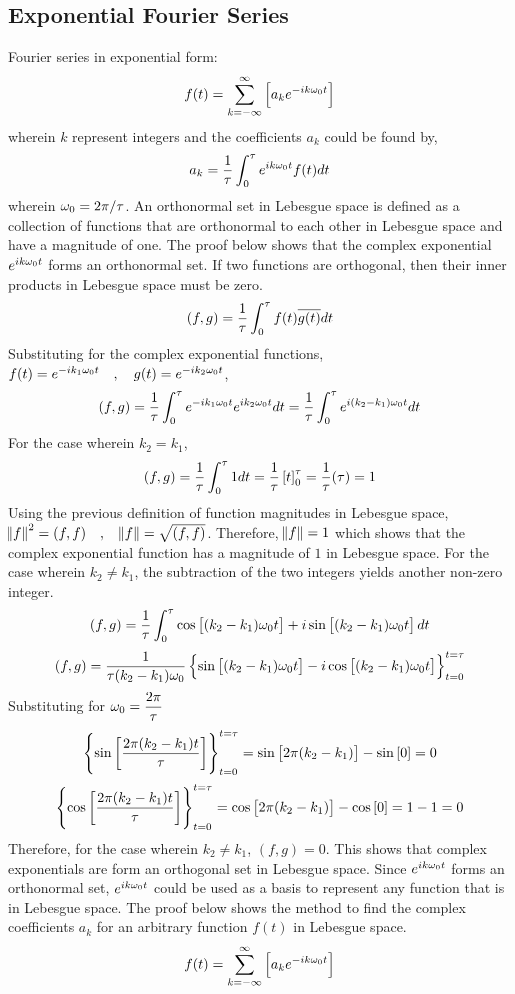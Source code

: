 \documentclass[class=report, 12pt, crop=false]{standalone}
\begin{document}
\begin{center}
\section{Exponential Fourier Series}
\begin{comment}
\end{comment}
Fourier series in exponential form:
$$f(t) = \sum^{\infty}_{k = -\infty}\left[a_ke^{-ik\omega_0t}\right]$$
wherein $k$ represent integers and the coefficients $a_k$ could be found by,
$$a_k = \frac{1}{\tau}\int^{\tau}_{0}e^{ik\omega_0t}f(t)dt$$
wherein $\omega_0 = 2\pi/\tau$. An orthonormal set in Lebesgue space is defined as a collection of functions that are orthonormal to each other in Lebesgue space and have a magnitude of one. The proof below shows that the complex exponential $e^{ik\omega_0t}$ forms an orthonormal set. If two functions are orthogonal, then their inner products in Lebesgue space must be zero.
$$(f,g) = \frac{1}{\tau}\int^{\tau}_{0}f(t)\overline{g(t)}dt$$
Substituting for the complex exponential functions, $f(t) = e^{-ik_1\omega_0t}\quad,\quad g(t) = e^{-ik_2\omega_0t}$,
$$(f,g) = \frac{1}{\tau}\int^{\tau}_{0}e^{-ik_1\omega_0t} e^{ik_2\omega_0t}dt = \frac{1}{\tau}\int^{\tau}_{0}e^{i(k_2-k_1)\omega_0t}dt$$
For the case wherein $k_2 = k_1$, 
$$(f,g) = \frac{1}{\tau}\int^{\tau}_{0}1dt = \frac{1}{\tau} \left[t\right]^{\tau}_{0} = \frac{1}{\tau}(\tau) = 1$$
Using the previous definition of function magnitudes in Lebesgue space, $\norm{f}^2 = (f,f)\quad,\quad\norm{f} = \sqrt{(f,f)}$. Therefore, $\norm{f} = 1$ which shows that the complex exponential function has a magnitude of $1$ in Lebesgue space. For the case wherein $k_2 \neq k_1$, the subtraction of the two integers yields another non-zero integer.
$$(f,g) = \frac{1}{\tau}\int^{\tau}_{0} \cos\left[(k_2-k_1)\omega_0t\right] + i\sin\left[(k_2-k_1)\omega_0t\right]dt$$
$$(f,g) = \frac{1}{\tau(k_2-k_1)\omega_0}\left\{\sin\left[(k_2-k_1)\omega_0t\right] - i\cos\left[(k_2-k_1)\omega_0t\right]\right\}^{t = \tau}_{t = 0}$$
Substituting for $\displaystyle{\omega_0 = \frac{2\pi}{\tau}}$ 
$$\left\{\sin\left[\frac{2\pi(k_2-k_1)t}{\tau}\right]\right\}^{t = \tau}_{t = 0} = \sin\left[2\pi(k_2-k_1)\right] - \sin\left[0\right] = 0$$
$$\left\{\cos\left[\frac{2\pi(k_2-k_1)t}{\tau}\right]\right\}^{t = \tau}_{t = 0} = \cos\left[2\pi(k_2-k_1)\right] - \cos\left[0\right] = 1 - 1 = 0$$
Therefore, for the case wherein $k_2 \neq k_1$, $(f,g) = 0$. This shows that complex exponentials are form an orthogonal set in Lebesgue space. Since $e^{ik\omega_0t}$ forms an orthonormal set, $e^{ik\omega_0t}$ could be used as a basis to represent any function that is in Lebesgue space. The proof below shows the method to find the complex coefficients $a_k$ for an arbitrary function $f(t)$ in Lebesgue space.
$$f(t) = \sum^{\infty}_{k = -\infty}\left[a_ke^{-ik\omega_0t}\right]$$

\end{center}
\end{document}
